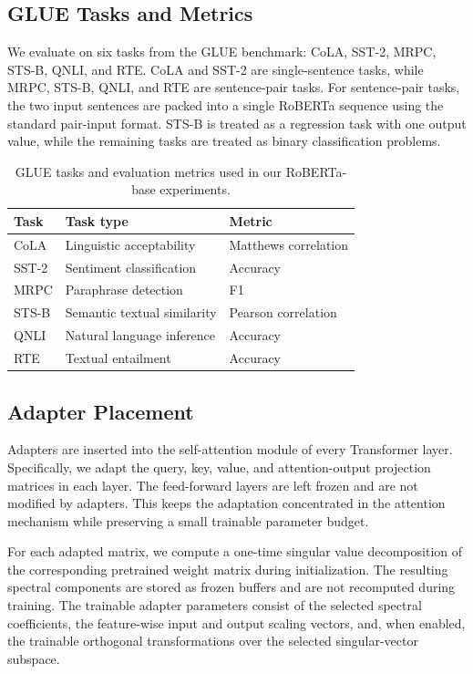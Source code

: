 \documentclass{article}
\begin{document}
\subsection{GLUE Tasks and Metrics}

We evaluate on six tasks from the GLUE benchmark: CoLA, SST-2, MRPC, STS-B, QNLI, and RTE. CoLA and SST-2 are single-sentence tasks, while MRPC, STS-B, QNLI, and RTE are sentence-pair tasks. For sentence-pair tasks, the two input sentences are packed into a single RoBERTa sequence using the standard pair-input format. STS-B is treated as a regression task with one output value, while the remaining tasks are treated as binary classification problems.

\begin{table}[h]
\centering
\caption{GLUE tasks and evaluation metrics used in our RoBERTa-base experiments.}
\label{tab:glue_tasks_metrics}
\begin{tabular}{lll}
\toprule
Task & Task type & Metric \\
\midrule
CoLA  & Linguistic acceptability & Matthews correlation \\
SST-2 & Sentiment classification & Accuracy \\
MRPC  & Paraphrase detection & F1 \\
STS-B & Semantic textual similarity & Pearson correlation \\
QNLI  & Natural language inference & Accuracy \\
RTE   & Textual entailment & Accuracy \\
\bottomrule
\end{tabular}
\end{table}

\subsection{Adapter Placement}

Adapters are inserted into the self-attention module of every Transformer layer. Specifically, we adapt the query, key, value, and attention-output projection matrices in each layer. The feed-forward layers are left frozen and are not modified by adapters. This keeps the adaptation concentrated in the attention mechanism while preserving a small trainable parameter budget.

For each adapted matrix, we compute a one-time singular value decomposition of the corresponding pretrained weight matrix during initialization. The resulting spectral components are stored as frozen buffers and are not recomputed during training. The trainable adapter parameters consist of the selected spectral coefficients, the feature-wise input and output scaling vectors, and, when enabled, the trainable orthogonal transformations over the selected singular-vector subspace.
\end{document}
